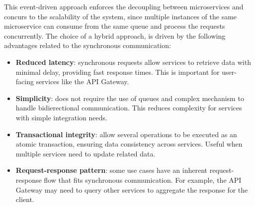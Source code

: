 \begin{itemize}
    This event-driven approach enforces the decoupling between microservices and concurs to the scalability of the system, since multiple instances of the same microservice can consume from the same queue and process the requests concurrently.
    The choice of a hybrid approach, is driven by the following advantages related to the synchronous communication:
    \begin{itemize}
        \item \textbf{Reduced latency}: synchronous requests allow services to retrieve data with minimal delay, providing fast response times. This is important for user-facing services like the API Gateway.
        \item \textbf{Simplicity}: does not require the use of queues and complex mechanism to handle bidierectional communication. This reduces complexity for services with simple integration needs.
        \item \textbf{Transactional integrity}:  allow several operations to be executed as an atomic transaction, ensuring data consistency across services. Useful when multiple services need to update related data.
        \item \textbf{Request-response pattern}: some use cases have an inherent request-response flow that fits synchronous communication. For example, the API Gateway may need to query other services to aggregate the response for the client.
    \end{itemize}

\end{itemize}
